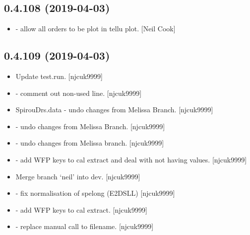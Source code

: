 \documentclass[a4paper,10pt,english]{report}
\begin{document}
\subsection{0.4.108 (2019-04-03)}
\label{\detokenize{misc/changelog:id150}}\begin{itemize}
\item {} 
 - allow all orders to be plot in tellu plot. {[}Neil Cook{]}

\end{itemize}


\subsection{0.4.109 (2019-04-03)}
\label{\detokenize{misc/changelog:id151}}\begin{itemize}
\item {} 
Update test.run. {[}njcuk9999{]}

\item {} 
 - comment out non-used line. {[}njcuk9999{]}

\item {} 
SpirouDrs.data - undo changes from Melissa Branch. {[}njcuk9999{]}

\item {} 
 - undo changes from Melissa Branch. {[}njcuk9999{]}

\item {} 
 - undo changes from Melissa branch.
{[}njcuk9999{]}

\item {} 
 - add WFP keys to cal extract and deal with
not having values. {[}njcuk9999{]}

\item {} 
Merge branch ‘neil’ into dev. {[}njcuk9999{]}

\item {} 
 - fix normalisation of spelong (E2DSLL) {[}njcuk9999{]}

\item {} 
 - add WFP keys to cal extract. {[}njcuk9999{]}

\item {} 
 - replace manual call to filename.
{[}njcuk9999{]}

\end{itemize}
\end{document}
